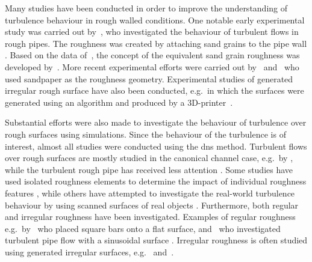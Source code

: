 Many studies have been conducted in order to improve the understanding of turbulence behaviour in rough walled conditions.
One notable early experimental study was carried out by~\citeauthor{StroemungsgesetzeNikuradse}, who investigated the behaviour of turbulent flows in rough pipes.
The roughness was created by attaching sand grains to the pipe wall \citep{StroemungsgesetzeNikuradse}. 
Based on the data of~\citeauthor{StroemungsgesetzeNikuradse}, the concept of the equivalent sand grain roughness was developed by~\cite{schlichtingExperimentelleUntersuchungenRauhigkeitsproblem1936}.
More recent experimental efforts were carried out by~\cite{schultzRoughwallTurbulentBoundary2007a} and~\cite{frohnapfelFlowResistanceHeterogeneous2024} who used sandpaper as the roughness geometry.
Experimental studies of generated irregular rough surface have also been conducted, e.g.\ in which the surfaces were generated using an algorithm and produced by a 3D-printer~\citep{flackSkinFrictionMeasurements2020}.

Substantial efforts were also made to investigate the behaviour of turbulence over rough surfaces using simulations.
Since the behaviour of the turbulence is of interest, almost all studies were conducted using the \acrshort{dns} method.
Turbulent flows over rough surfaces are mostly studied in the canonical channel case, e.g.\ by \citep{thakkarInvestigationTurbulentFlow2017,flackSkinFrictionMeasurements2020,kimTurbulenceStatisticsFully1987,jellyReynoldsDispersiveShear2018}, while the turbulent rough pipe has received less attention \citep{chanSystematicInvestigationRoughness2015,demaioDirectNumericalSimulation2023}.
Some studies have used isolated roughness elements to determine the impact of individual roughness features \citep{chatzikyriakouDNSTurbulentFlow2015}, while others have attempted to investigate the real-world turbulence behaviour by using scanned surfaces of real objects \citep{thakkarSurfaceCorrelationsHydrodynamic2017,flackSkinFrictionMeasurements2020,frohnapfelFlowResistanceHeterogeneous2024}.
Furthermore, both regular and irregular roughness have been investigated.
Examples of regular roughness e.g.\ by~\citeauthor{leonardiStructureTurbulentChannel2004} who placed square bars onto a flat surface, and~\citeauthor{chanSystematicInvestigationRoughness2015} who investigated turbulent pipe flow with a sinusoidal surface \citep{chanSystematicInvestigationRoughness2015,chanSecondaryMotionTurbulent2018,leonardiStructureTurbulentChannel2004}.
Irregular roughness is often studied using generated irregular surfaces, e.g.\ \cite{thakkarInvestigationTurbulentFlow2017,busseReynoldsnumberDependenceNearwall2017} and~\cite{demaioDirectNumericalSimulation2023}.

